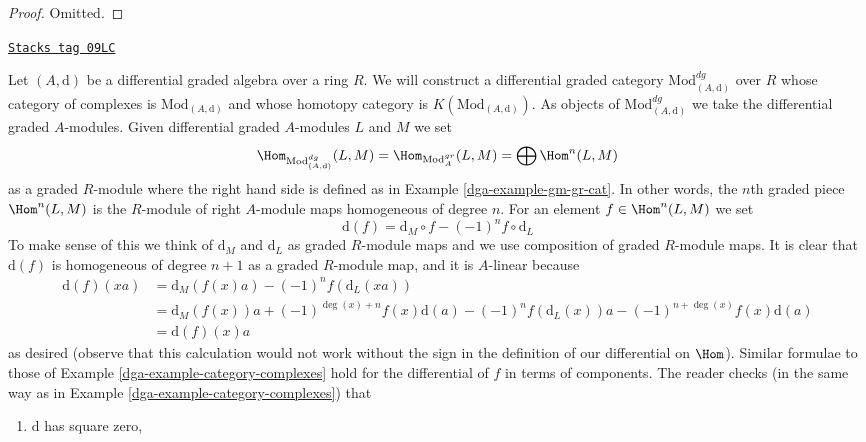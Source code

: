 \begin{proof}
Omitted.
\end{proof}

\begin{example}

\label{dga-example-dgm-dg-cat}
\href{https://stacks.math.columbia.edu/tag/09LC}{\texttt{Stacks tag 09LC}}

Let $(A, \text{d})$ be a differential graded algebra over a ring $R$. We will
construct a differential graded category $\text{Mod}^{dg}_{(A, \text{d})}$
over $R$ whose category of complexes is $\text{Mod}_{(A, \text{d})}$ and
whose homotopy category is $K(\text{Mod}_{(A, \text{d})})$.
As objects of $\text{Mod}^{dg}_{(A, \text{d})}$
we take the differential graded $A$-modules. Given differential
graded $A$-modules $L$ and $M$ we set
$$
\Hom_{\text{Mod}^{dg}_{(A, \text{d})}}(L, M) =
\Hom_{\text{Mod}^{gr}_A}(L, M) = \bigoplus \Hom^n(L, M)
$$
as a graded $R$-module where the right hand side is defined as in
Example \ref{dga-example-gm-gr-cat}. In other words, the $n$th graded piece
$\Hom^n(L, M)$ is the $R$-module of right $A$-module maps homogeneous
of degree $n$. For an element $f \in \Hom^n(L, M)$ we set
$$
\text{d}(f) = \text{d}_M \circ f - (-1)^n f \circ \text{d}_L
$$
To make sense of this we think of $\text{d}_M$ and $\text{d}_L$
as graded $R$-module maps and we use composition of graded
$R$-module maps. It is clear that $\text{d}(f)$ is homogeneous of
degree $n + 1$ as a graded $R$-module map, and it is $A$-linear
because
\begin{align*}
\text{d}(f)(xa)
& =
\text{d}_M(f(x) a) - (-1)^n f (\text{d}_L(xa)) \\
& =
\text{d}_M(f(x)) a + (-1)^{\deg(x) + n} f(x) \text{d}(a)
- (-1)^n f(\text{d}_L(x)) a - (-1)^{n + \deg(x)} f(x) \text{d}(a) \\
& = \text{d}(f)(x) a
\end{align*}
as desired (observe that this calculation would not work without the
sign in the definition of our differential on $\Hom$). Similar formulae
to those of Example \ref{dga-example-category-complexes} hold for the
differential of $f$ in terms of components.
The reader checks (in the same way as in
Example \ref{dga-example-category-complexes}) that
\begin{enumerate}
\item $\text{d}$ has square zero,

\end{enumerate}
\end{example}
